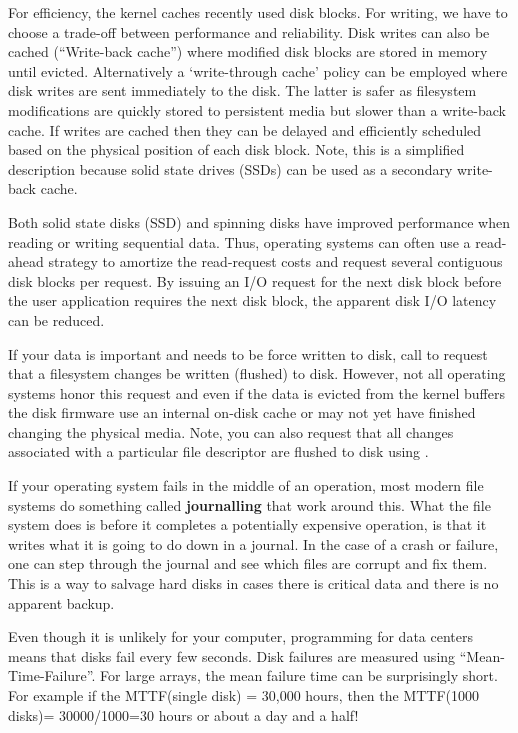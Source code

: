 For efficiency, the kernel caches recently used disk blocks.
For writing, we have to choose a trade-off between performance and reliability.
Disk writes can also be cached (``Write-back cache'') where modified disk blocks are stored in memory until evicted.
Alternatively a `write-through cache' policy can be employed where disk writes are sent immediately to the disk.
The latter is safer as filesystem modifications are quickly stored to persistent media but slower than a write-back cache.
If writes are cached then they can be delayed and efficiently scheduled based on the physical position of each disk block.
Note, this is a simplified description because solid state drives (SSDs) can be used as a secondary write-back cache.

Both solid state disks (SSD) and spinning disks have improved performance when reading or writing sequential data.
Thus, operating systems can often use a read-ahead strategy to amortize the read-request costs and request several contiguous disk blocks per request.
By issuing an I/O request for the next disk block before the user application requires the next disk block, the apparent disk I/O latency can be reduced.

If your data is important and needs to be force written to disk, call  to request that a filesystem changes be written (flushed) to disk.
However, not all operating systems honor this request and even if the data is evicted from the kernel buffers the disk firmware use an internal on-disk cache or may not yet have finished changing the physical media.
Note, you can also request that all changes associated with a particular file descriptor are flushed to disk using .

If your operating system fails in the middle of an operation, most modern file systems do something called \textbf{journalling} that work around this.
What the file system does is before it completes a potentially expensive operation, is that it writes what it is going to do down in a journal.
In the case of a crash or failure, one can step through the journal and see which files are corrupt and fix them.
This is a way to salvage hard disks in cases there is critical data and there is no apparent backup.

Even though it is unlikely for your computer, programming for data centers means that disks fail every few seconds.
Disk failures are measured using ``Mean-Time-Failure''.
For large arrays, the mean failure time can be surprisingly short.
For example if the MTTF(single disk) = 30,000 hours, then the MTTF(1000 disks)= 30000/1000=30 hours or about a day and a half!

